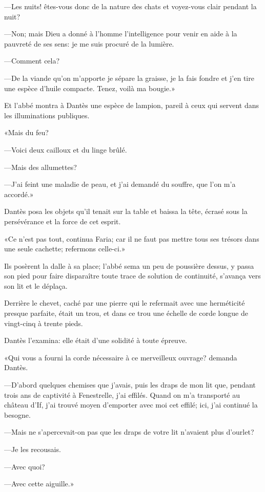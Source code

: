 —Les nuits! êtes-vous donc de la nature des chats et voyez-vous clair pendant la nuit?

—Non; mais Dieu a donné à l'homme l'intelligence pour venir en aide à la pauvreté de ses sens: je me suis procuré de la lumière.

—Comment cela?

—De la viande qu'on m'apporte je sépare la graisse, je la fais fondre et j'en tire une espèce d'huile compacte. Tenez, voilà ma bougie.»

Et l'abbé montra à Dantès une espèce de lampion, pareil à ceux qui servent dans les illuminations publiques.

«Mais du feu?

—Voici deux cailloux et du linge brûlé.

—Mais des allumettes?

—J'ai feint une maladie de peau, et j'ai demandé du souffre, que l'on m'a accordé.»

Dantès posa les objets qu'il tenait sur la table et baissa la tête, écrasé sous la persévérance et la force de cet esprit.

«Ce n'est pas tout, continua Faria; car il ne faut pas mettre tous ses trésors dans une seule cachette; refermons celle-ci.»

Ils posèrent la dalle à sa place; l'abbé sema un peu de poussière dessus, y passa son pied pour faire disparaître toute trace de solution de continuité, s'avança vers son lit et le déplaça.

Derrière le chevet, caché par une pierre qui le refermait avec une herméticité presque parfaite, était un trou, et dans ce trou une échelle de corde longue de vingt-cinq à trente pieds.

Dantès l'examina: elle était d'une solidité à toute épreuve.

«Qui vous a fourni la corde nécessaire à ce merveilleux ouvrage? demanda Dantès.

—D'abord quelques chemises que j'avais, puis les draps de mon lit que, pendant trois ans de captivité à Fenestrelle, j'ai effilés. Quand on m'a transporté au château d'If, j'ai trouvé moyen d'emporter avec moi cet effilé; ici, j'ai continué la besogne.

—Mais ne s'apercevait-on pas que les draps de votre lit n'avaient plus d'ourlet?

—Je les recousais.

—Avec quoi?

—Avec cette aiguille.»

